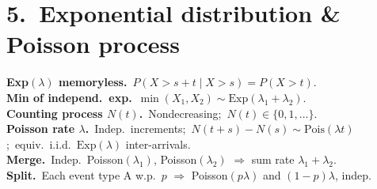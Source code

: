 \section*{5.\ Exponential distribution \& Poisson process}
\textbf{Exp$(\lambda)$ memoryless.}\ $P(X>s+t\mid X>s)=P(X>t)$.\\
\textbf{Min of independ.\ exp.}\ $\min(X_1,X_2)\sim\mathrm{Exp}(\lambda_1+\lambda_2)$.\\
\textbf{Counting process $N(t)$.}\ Nondecreasing;\ $N(t)\in\{0,1,\ldots\}$.\\
\textbf{Poisson rate $\lambda$.}\ Indep.\ increments;\ $N(t+s)-N(s)\sim\mathrm{Pois}(\lambda t)$;\ equiv.\ i.i.d.\ $\mathrm{Exp}(\lambda)$ inter-arrivals.\\
\textbf{Merge.}\ Indep.\ Poisson$(\lambda_1)$, Poisson$(\lambda_2)$ $\Rightarrow$ sum rate $\lambda_1+\lambda_2$.\\
\textbf{Split.}\ Each event type A w.p.\ $p$ $\Rightarrow$ Poisson$(p\lambda)$ and $(1-p)\lambda$, indep.
